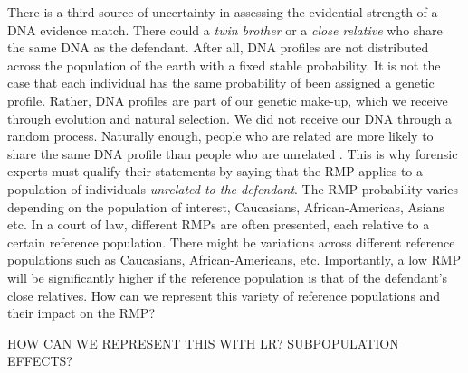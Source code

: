 \documentclass[10pt]{article}
\begin{document}
There is a third source of uncertainty in assessing the evidential strength of a DNA evidence match. There could 
a \textit{twin brother} or a \textit{close relative} who share the same DNA as the defendant.
After all, DNA profiles are not distributed across the population of the earth with a fixed stable probability. It is not the case that each individual has the same probability of been assigned a genetic profile. Rather, DNA profiles are part of our genetic make-up, which we receive through evolution and natural selection. We did not receive our DNA through a random process. Naturally enough, people who are related are more likely to share the same DNA profile than people who are unrelated \citep{Buckleton2005Population, Weir2007rarity}. This is why forensic experts must qualify their statements by saying that the RMP applies to a population of individuals \textit{unrelated to the defendant}. The RMP probability varies depending on the population of interest, Caucasians, African-Americas, Asians etc.  In a court of law, different RMPs are often presented, each relative to a certain reference population. 
There might be variations across different reference populations such as Caucasians, African-Americans, etc.
Importantly, a low RMP will be significantly higher if the reference population is 
that of the defendant's close relatives.  How can we represent this variety of reference 
populations and their impact on the RMP?

HOW CAN WE REPRESENT THIS WITH LR?
SUBPOPULATION EFFECTS?
\end{document}
